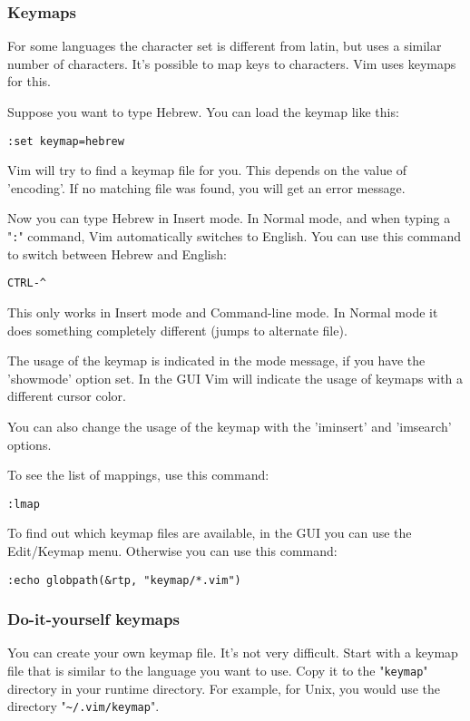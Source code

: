 \subsubsection{Keymaps}
For some languages the character set is different from latin, but uses a similar number of characters.
It's possible to map keys to characters.
Vim uses keymaps for this.

Suppose you want to type Hebrew.
You can load the keymap like this:

\begin{Verbatim}[samepage=true]
 :set keymap=hebrew
\end{Verbatim}

Vim will try to find a keymap file for you.
This depends on the value of 'encoding'.
If no matching file was found, you will get an error message.

Now you can type Hebrew in Insert mode.
In Normal mode, and when typing a "\verb!:!" command, Vim automatically switches to English.
You can use this command to switch between Hebrew and English:

\begin{Verbatim}[samepage=true]
 CTRL-^
\end{Verbatim}

This only works in Insert mode and Command-line mode.
In Normal mode it does something completely different (jumps to alternate file).

The usage of the keymap is indicated in the mode message, if you have the 'showmode' option set.
In the GUI Vim will indicate the usage of keymaps with a different cursor color.

You can also change the usage of the keymap with the 'iminsert' and 'imsearch' options.

To see the list of mappings, use this command:

\begin{Verbatim}[samepage=true]
 :lmap
\end{Verbatim}

To find out which keymap files are available, in the GUI you can use the Edit/Keymap menu.
Otherwise you can use this command:

\begin{Verbatim}[samepage=true]
 :echo globpath(&rtp, "keymap/*.vim")
\end{Verbatim}

\subsubsection{Do-it-yourself keymaps}
You can create your own keymap file.
It's not very difficult.
Start with a keymap file that is similar to the language you want to use.
Copy it to the "\verb!keymap!" directory in your runtime directory.
For example, for Unix, you would use the directory "\verb!~/.vim/keymap!".

